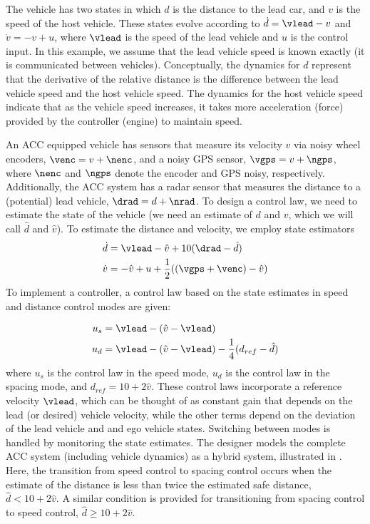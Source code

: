 The vehicle has two states in which $d$ is the distance to the lead car, and $v$ is the speed of the host vehicle. These states evolve according to $\dot{d} = \vlead - v$ and $\dot{v} = -v + u$, 
%
where $\vlead$ is the speed of the lead vehicle  and $u$ is the control input.  In this example, we assume that the lead vehicle speed is known exactly (\eg it is communicated between vehicles). Conceptually, the dynamics for $d$ represent that the derivative of the relative distance is the difference between the lead vehicle speed and the host vehicle speed.  The dynamics for the host vehicle speed indicate that as the vehicle speed increases, it takes more acceleration (\ie force) provided by the controller (\ie engine) to maintain speed. 

An ACC equipped vehicle has sensors that measure its velocity $v$ via noisy wheel encoders, $\venc = v + \nenc$, and a noisy GPS sensor, $\vgps = v+\ngps$, where $\nenc$ and $\ngps$ denote the encoder and GPS noisy, respectively. 
%
%
Additionally, the ACC system has a radar sensor that measures the distance to a (potential) lead vehicle, $\drad = d+\nrad$. 
%
To design a control law, we need to estimate the state of the vehicle (\ie we need an estimate of $d$ and $v$, which we will call $\hat{d}$ and $\hat{v}$). To estimate the distance and velocity, we employ state estimators
%
\begin{align}
\dot{d} & = \vlead - \hat{v} + 10(\drad - \hat{d}) \nonumber \\
\dot{v} & = -\hat{v} + u +  \frac{1}{2} ((\vgps + \venc) - \hat{v}) \nonumber
\end{align}
%
%
To implement a controller, a control law based on the state estimates in speed and distance control modes are given: 

\begin{align}
u_s & = \vlead - (\hat{v}-\vlead) \nonumber \\
u_d & = \vlead - (\hat{v}-\vlead) - \frac{1}{4} (d_{ref} - \hat{d}) \nonumber
\end{align}
%
%
where $u_s$ is the control law in the speed mode, $u_d$ is the control law in the spacing mode, and $d_{ref} = 10 + 2\hat{v}$. These control laws incorporate a reference velocity $\vlead$, which can be thought of as constant gain that depends on the lead (or desired) vehicle velocity, while the other terms depend on the deviation of the lead vehicle and and ego vehicle states. Switching between modes is handled by monitoring the state estimates. The designer models the complete ACC system (including vehicle dynamics) as a hybrid system, illustrated in . Here, the transition from speed control to spacing control occurs when the estimate of the distance is less than twice the estimated safe distance, \ie $\hat{d} < 10 + 2\hat{v}$. A similar condition is provided for transitioning from spacing control to speed control, \ie $\hat{d} \geq 10 + 2\hat{v}$. 

